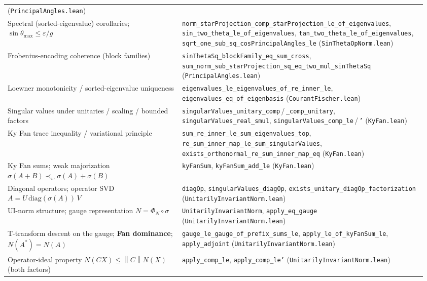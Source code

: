 \documentclass[11pt]{article}
\newcommand{\norm}[1]{\left\lVert #1\right\rVert}
\newcommand{\eps}{\varepsilon}
\newcommand{\gap}{g}
\theoremstyle{remark}
\begin{document}
\begin{center}
\begin{tabular}{@{}p{0.40\linewidth}p{0.56\linewidth}@{}}
    (\texttt{PrincipalAngles.lean}) \\
Spectral (sorted-eigenvalue) corollaries; $\sin\theta_{\max}\le\eps/\gap$
  & \texttt{norm\_starProjection\_comp\_starProjection\_le\_of\_eigenvalues},
    \texttt{sin\_two\_theta\_le\_of\_eigenvalues},
    \texttt{tan\_two\_theta\_le\_of\_eigenvalues},
    \texttt{sqrt\_one\_sub\_sq\_cosPrincipalAngles\_le}
    (\texttt{SinThetaOpNorm.lean}) \\
Frobenius-encoding coherence (block families)
  & \texttt{sinThetaSq\_blockFamily\_eq\_sum\_cross},
    \texttt{sum\_norm\_sub\_starProjection\_sq\_eq\_two\_mul\_sinThetaSq}
    (\texttt{PrincipalAngles.lean}) \\
Loewner monotonicity / sorted-eigenvalue uniqueness
  & \texttt{eigenvalues\_le\_eigenvalues\_of\_re\_inner\_le},
    \texttt{eigenvalues\_eq\_of\_eigenbasis} (\texttt{CourantFischer.lean}) \\
Singular values under unitaries / scaling / bounded factors
  & \texttt{singularValues\_unitary\_comp}\,/\,\texttt{\_comp\_unitary},
    \texttt{singularValues\_real\_smul},
    \texttt{singularValues\_comp\_le}\,/\,\texttt{'} (\texttt{KyFan.lean}) \\
Ky Fan trace inequality / variational principle
  & \texttt{sum\_re\_inner\_le\_sum\_eigenvalues\_top},
    \texttt{re\_sum\_inner\_map\_le\_sum\_singularValues},
    \texttt{exists\_orthonormal\_re\_sum\_inner\_map\_eq} (\texttt{KyFan.lean}) \\
Ky Fan sums; weak majorization $\sigma(A+B)\prec_w\sigma(A)+\sigma(B)$
  & \texttt{kyFanSum}, \texttt{kyFanSum\_add\_le} (\texttt{KyFan.lean}) \\
Diagonal operators; operator SVD $A=U\,\mathrm{diag}(\sigma(A))\,V$
  & \texttt{diagOp}, \texttt{singularValues\_diagOp},
    \texttt{exists\_unitary\_diagOp\_factorization}
    (\texttt{UnitarilyInvariantNorm.lean}) \\
UI-norm structure; gauge representation $N=\Phi_N\circ\sigma$
  & \texttt{UnitarilyInvariantNorm}, \texttt{apply\_eq\_gauge}
    (\texttt{UnitarilyInvariantNorm.lean}) \\
T-transform descent on the gauge; \textbf{Fan dominance}; $N(A^{*})=N(A)$
  & \texttt{gauge\_le\_gauge\_of\_prefix\_sums\_le},
    \texttt{apply\_le\_of\_kyFanSum\_le}, \texttt{apply\_adjoint}
    (\texttt{UnitarilyInvariantNorm.lean}) \\
Operator-ideal property $N(CX)\le\norm{C}N(X)$ (both factors)
  & \texttt{apply\_comp\_le}, \texttt{apply\_comp\_le'}
    (\texttt{UnitarilyInvariantNorm.lean}) \\

\end{tabular}
\end{center}
\end{document}
